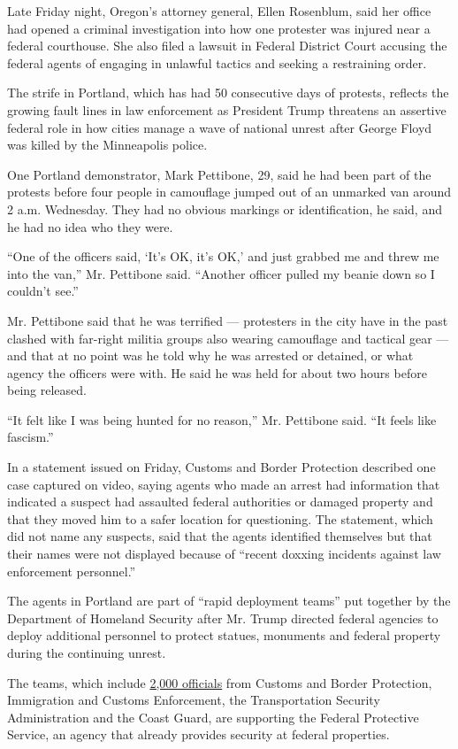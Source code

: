 Late Friday night, Oregon's attorney general, Ellen Rosenblum, said her
office had opened a criminal investigation into how one protester was
injured near a federal courthouse. She also filed a lawsuit in Federal
District Court accusing the federal agents of engaging in unlawful
tactics and seeking a restraining order.

The strife in Portland, which has had 50 consecutive days of protests,
reflects the growing fault lines in law enforcement as President Trump
threatens an assertive federal role in how cities manage a wave of
national unrest after George Floyd was killed by the Minneapolis police.

One Portland demonstrator, Mark Pettibone, 29, said he had been part of
the protests before four people in camouflage jumped out of an unmarked
van around 2 a.m. Wednesday. They had no obvious markings or
identification, he said, and he had no idea who they were.

``One of the officers said, `It's OK, it's OK,' and just grabbed me and
threw me into the van,'' Mr. Pettibone said. ``Another officer pulled my
beanie down so I couldn't see.''

Mr. Pettibone said that he was terrified --- protesters in the city have
in the past clashed with far-right militia groups also wearing
camouflage and tactical gear --- and that at no point was he told why he
was arrested or detained, or what agency the officers were with. He said
he was held for about two hours before being released.

``It felt like I was being hunted for no reason,'' Mr. Pettibone said.
``It feels like fascism.''

In a statement issued on Friday, Customs and Border Protection described
one case captured on video, saying agents who made an arrest had
information that indicated a suspect had assaulted federal authorities
or damaged property and that they moved him to a safer location for
questioning. The statement, which did not name any suspects, said that
the agents identified themselves but that their names were not displayed
because of ``recent doxxing incidents against law enforcement
personnel.''

The agents in Portland are part of ``rapid deployment teams'' put
together by the Department of Homeland Security after Mr. Trump directed
federal agencies to deploy additional personnel to protect statues,
monuments and federal property during the continuing unrest.

The teams, which include
\href{https://www.nytimes3xbfgragh.onion/2020/07/10/us/politics/homeland-security-statues-trump.html}{2,000
officials} from Customs and Border Protection, Immigration and Customs
Enforcement, the Transportation Security Administration and the Coast
Guard, are supporting the Federal Protective Service, an agency that
already provides security at federal properties.

